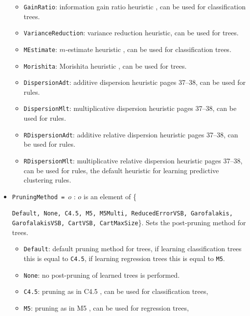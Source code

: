 \documentclass[a4paper]{report}
\begin{document}
\begin{itemize}
\begin{itemize}
		\item \texttt{GainRatio}: information gain ratio heuristic \cite{Quinlan1986}, can be used for classification trees.
		\item \texttt{VarianceReduction}: variance reduction heuristic, can be used for trees.
		\item \texttt{MEstimate}: $m$-estimate heuristic \cite{Cestnik1990}, can be used for classification trees.
		\item \texttt{Morishita}: Morishita heuristic \cite{Sese2004}, can be used for trees.%
		\item \texttt{DispersionAdt}: additive dispersion heuristic \cite{Zenko07} pages 37--38, can be used for rules.
		\item \texttt{DispersionMlt}: multiplicative dispersion heuristic \cite{Zenko07} pages 37--38, can be used for rules.
		\item \texttt{RDispersionAdt}: additive relative dispersion heuristic \cite{Zenko07} pages 37--38, can be used for rules.
		\item \texttt{RDispersionMlt}: multiplicative relative dispersion heuristic \cite{Zenko07} pages 37--38, can be used for rules, the default heuristic for learning predictive clustering rules.
	\end{itemize}
	\item \texttt{PruningMethod = $o$} : $o$ is an element of \{\raggedright\texttt{Default, None, C4.5, M5, M5Multi, ReducedErrorVSB, Garofalakis, GarofalakisVSB, CartVSB, CartMaxSize}\}. Sets the post-pruning method for trees.
	\begin{itemize}
		\item \texttt{Default}: default pruning method for trees, if learning classification trees this is equal to \texttt{C4.5}, if learning regression trees this is equal to \texttt{M5}. %
		\item \texttt{None}: no post-pruning of learned trees is performed.
		\item \texttt{C4.5}: pruning as in C4.5 \cite{Quinlan1993}, can be used for classification trees,
		\item \texttt{M5}: pruning as in M5 \cite{Quinlan1992},	can be used for regression trees,

\end{itemize}
\end{itemize}
\end{document}
